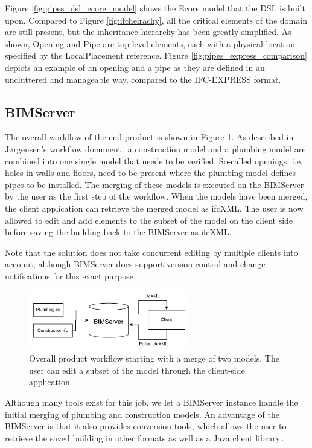 Figure \ref{fig:pipes_dsl_ecore_model} shows the Ecore model that the DSL is built upon. Compared to Figure \ref{fig:ifcheirachy}, all the critical elements of the domain are still present, but the inheritance hierarchy has been greatly simplified. As shown, Opening and Pipe are top level elements, each with a physical location specified by the LocalPlacement reference. Figure \ref{fig:pipes_express_comparison} depicts an example of an opening and a pipe as they are defined in an uncluttered and manageable way, compared to the IFC-EXPRESS format.

\subsection{BIMServer}
The overall workflow of the end product is shown in Figure \ref{fig:overall_product_workflow}. As described in J\o rgensen's workflow document\,\cite{jorgensen12}, a construction model and a plumbing model are combined into one single model that needs to be verified. So-called openings, i.e. holes in walls and floors, need to be present where the plumbing model defines pipes to be installed. The merging of these models is executed on the BIMServer by the user as the first step of the workflow. When the models have been merged, the client application can retrieve the merged model as ifcXML. The user is now allowed to edit and add elements to the subset of the model on the client side before saving the building back to the BIMServer as ifcXML.

Note that the solution does not take concurrent editing by multiple clients into account, although BIMServer does support version control and change notifications for this exact purpose.

\begin{figure}[t]
    \centering
        \includegraphics[width=70mm]{images/CompleteWorkflow.pdf}
    \caption{Overall product workflow starting with a merge of two models. The user can edit a subset of the model through the client-side application.}
    \label{fig:overall_product_workflow}
\end{figure}

Although many tools exist for this job, we let a BIMServer instance handle the initial merging of plumbing and construction models. An advantage of the BIMServer is that it also provides conversion tools, which allows the user to retrieve the saved building in other formats as well as a Java client library\,\cite{beetz10}.


